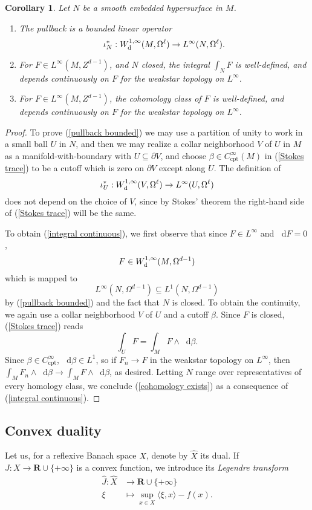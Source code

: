 \documentclass[reqno,11pt]{amsart}
\newcommand{\RR}{\mathbf{R}}
\newcommand*\dif{\mathop{}\!\mathrm{d}}
\newcommand{\dfn}[1]{\emph{#1}\index{#1}}
\newcommand{\cpt}{\mathrm{cpt}}
\newtheorem{corollary}[theorem]{Corollary}
\theoremstyle{definition}
\numberwithin{equation}{section}
\begin{document}
\begin{corollary}\label{trace on cycles}
Let $N$ be a smooth embedded hypersurface in $M$.
\begin{enumerate}
\item \label{pullback bounded} The pullback is a bounded linear operator
$$\iota^*_N: W^{1, \infty}_{\rm d}(M, \Omega^\ell) \to L^\infty(N, \Omega^\ell).$$
\item \label{integral continuous} For $F \in L^\infty(M, Z^{d - 1})$, and $N$ closed, the integral $\int_N F$ is well-defined, and depends continuously on $F$ for the weakstar topology on $L^\infty$.
\item \label{cohomology exists} For $F \in L^\infty(M, Z^{d - 1})$, the cohomology class of $F$ is well-defined, and depends continuously on $F$ for the weakstar topology on $L^\infty$.
\end{enumerate}
\end{corollary}
\begin{proof}
To prove (\ref{pullback bounded}) we may use a partition of unity to work in a small ball $U$ in $N$, and then we may realize a collar neighborhood $V$ of $U$ in $M$ as a manifold-with-boundary with $U \subseteq \partial V$, and choose $\beta \in C^\infty_\cpt(M)$ in (\ref{Stokes trace}) to be a cutoff which is zero on $\partial V$ except along $U$.
The definition of
$$\iota^*_U: W^{1, \infty}_{\rm d}(V, \Omega^\ell) \to L^\infty(U, \Omega^\ell)$$
does not depend on the choice of $V$, since by Stokes' theorem the right-hand side of (\ref{Stokes trace}) will be the same.

To obtain (\ref{integral continuous}), we first observe that since $F \in L^\infty$ and $\dif F = 0$,
$$F \in W^{1, \infty}_{\rm d}(M, \Omega^{d - 1})$$
which is mapped to
$$L^\infty(N, \Omega^{d - 1}) \subseteq L^1(N, \Omega^{d - 1})$$
by (\ref{pullback bounded}) and the fact that $N$ is closed.
To obtain the continuity, we again use a collar neighborhood $V$ of $U$ and a cutoff $\beta$.
Since $F$ is closed, (\ref{Stokes trace}) reads 
$$\int_U F = \int_M F \wedge \dif \beta.$$
Since $\beta \in C^\infty_\cpt$, $\dif \beta \in L^1$, so if $F_n \to F$ in the weakstar topology on $L^\infty$, then $\int_M F_n \wedge \dif \beta \to \int_M F \wedge \dif \beta$, as desired.
Letting $N$ range over representatives of every homology class, we conclude (\ref{cohomology exists}) as a consequence of (\ref{integral continuous}).
\end{proof}

\subsection{Convex duality}
Let us, for a reflexive Banach space $X$, denote by $\hat X$ its dual.
If $J: X \to \RR \cup \{+\infty\}$ is a convex function, we introduce its \dfn{Legendre transform}
\begin{align*}
	\hat J: \hat X &\to \RR \cup \{+\infty\}\\
	\xi &\mapsto \sup_{x \in X} \langle \xi, x\rangle - f(x).
\end{align*}
\end{document}
